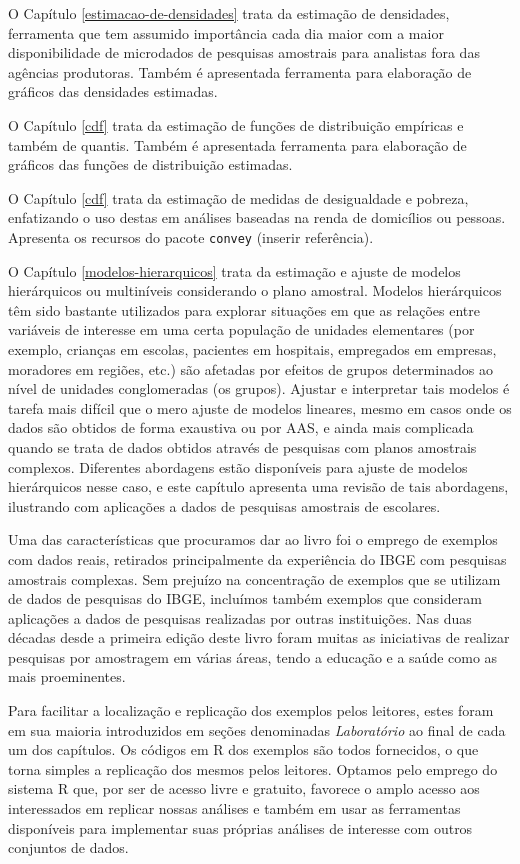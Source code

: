 \documentclass[
]{book}
\begin{document}
O Capítulo \ref{estimacao-de-densidades} trata da estimação de densidades, ferramenta que tem assumido importância cada dia maior com a maior disponibilidade de microdados de pesquisas amostrais para analistas
fora das agências produtoras. Também é apresentada ferramenta para elaboração de gráficos das densidades estimadas.

O Capítulo \ref{cdf} trata da estimação de funções de distribuição empíricas e também de quantis. Também é apresentada ferramenta para elaboração de gráficos das funções de distribuição estimadas.

O Capítulo \ref{cdf} trata da estimação de medidas de desigualdade e pobreza, enfatizando o uso destas em análises baseadas na renda de domicílios ou pessoas. Apresenta os recursos do pacote \texttt{convey} (inserir referência).

O Capítulo \ref{modelos-hierarquicos} trata da estimação e ajuste de modelos hierárquicos ou multiníveis considerando o plano amostral. Modelos hierárquicos têm sido bastante utilizados para explorar situações em que as relações entre variáveis de interesse em uma certa população de unidades elementares (por exemplo, crianças em escolas, pacientes em hospitais, empregados em empresas, moradores em regiões, etc.) são afetadas por efeitos de grupos determinados ao nível de unidades conglomeradas (os grupos). Ajustar e interpretar tais modelos é tarefa mais difícil que o mero ajuste de modelos lineares, mesmo em casos onde os dados são obtidos de forma exaustiva ou por AAS, e ainda mais complicada quando se trata de dados obtidos através de pesquisas com planos amostrais complexos. Diferentes abordagens estão disponíveis para ajuste de modelos hierárquicos nesse caso, e este capítulo apresenta uma revisão de tais abordagens, ilustrando com aplicações a dados de pesquisas amostrais de escolares.

Uma das características que procuramos dar ao livro foi o emprego de exemplos com dados reais, retirados principalmente da experiência do IBGE com pesquisas amostrais complexas. Sem prejuízo na concentração de exemplos que se utilizam de dados de pesquisas do IBGE, incluímos também exemplos que consideram aplicações a dados de pesquisas realizadas por outras instituições. Nas duas décadas desde a primeira edição deste livro foram muitas as iniciativas de realizar pesquisas por amostragem em várias áreas, tendo a educação e a saúde como as mais proeminentes.

Para facilitar a localização e replicação dos exemplos pelos leitores, estes foram em sua maioria introduzidos em seções denominadas \emph{Laboratório} ao final de cada um dos capítulos. Os códigos em R dos exemplos são todos fornecidos, o que torna simples a replicação dos mesmos pelos leitores. Optamos pelo emprego do sistema R que, por ser de acesso livre e gratuito, favorece o amplo acesso aos interessados em replicar nossas análises e também em usar as ferramentas disponíveis para implementar suas próprias análises de interesse com outros conjuntos de dados.
\end{document}
